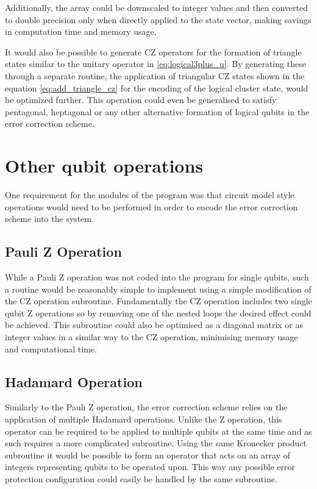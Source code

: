 Additionally, the array could be downscaled to integer values and then converted to double precision only when directly applied to the state vector, making savings in computation time and memory usage.

It would also be possible to generate CZ operators for the formation of triangle states similar to the unitary operator in \eqref{eq:logical3plus_u}. By generating these through a separate routine, the application of triangular CZ states shown in the equation \eqref{eq:add_triangle_cz} for the encoding of the logical cluster state, would be optimized further. This operation could even be generalised to satisfy pentagonal, heptagonal or any other alternative formation of logical qubits in the error correction scheme.


\section{Other qubit operations}

One requirement for the modules of the program was that circuit model style operations would need to be performed in order to encode the error correction scheme into the system. 


\subsection{Pauli Z Operation}

While a Pauli Z operation was not coded into the program for single qubits, such a routine would be reasonably simple to implement using a simple modification of the CZ operation subroutine. Fundamentally the CZ operation includes two single qubit Z operations so by removing one of the nested loops the desired effect could be achieved. This subroutine could also be optimised as a diagonal matrix or as integer values in a similar way to the CZ operation, minimising memory usage and computational time.


\subsection{Hadamard Operation}

Similarly to the Pauli Z operation, the error correction scheme relies on the application of multiple Hadamard operations. Unlike the Z operation, this operator can be required to be applied to multiple qubits at the same time and as such requires a more complicated subroutine. Using the same Kronecker product subroutine it would be possible to form an operator that acts on an array of integers representing qubits to be operated upon. This way any possible error protection configuration could easily be handled by the same subroutine.

